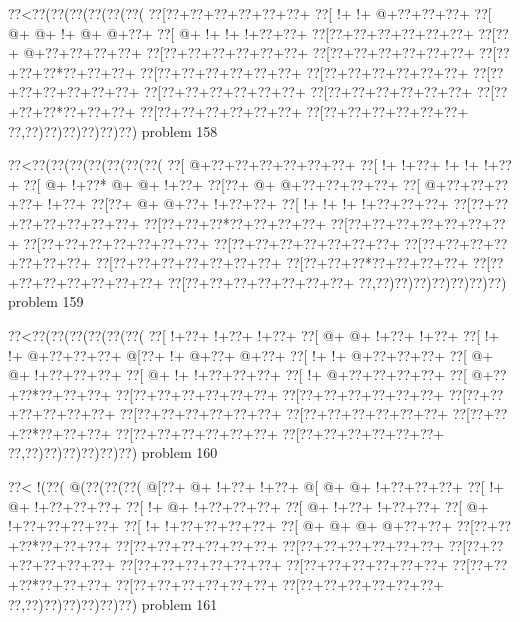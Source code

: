\vbox{\vbox{\goo
\0??<\0??(\0??(\0??(\0??(\0??(\0??(
\0??[\0??+\0??+\0??+\0??+\0??+\0??+
\0??[\- !+\- !+\- @+\0??+\0??+\0??+
\0??[\- @+\- @+\- !+\- @+\- @+\0??+
\0??[\- @+\- !+\- !+\- !+\0??+\0??+
\0??[\0??+\0??+\0??+\0??+\0??+\0??+
\0??[\0??+\- @+\0??+\0??+\0??+\0??+
\0??[\0??+\0??+\0??+\0??+\0??+\0??+
\0??[\0??+\0??+\0??+\0??+\0??+\0??+
\0??[\0??+\0??+\0??*\0??+\0??+\0??+
\0??[\0??+\0??+\0??+\0??+\0??+\0??+
\0??[\0??+\0??+\0??+\0??+\0??+\0??+
\0??[\0??+\0??+\0??+\0??+\0??+\0??+
\0??[\0??+\0??+\0??+\0??+\0??+\0??+
\0??[\0??+\0??+\0??+\0??+\0??+\0??+
\0??[\0??+\0??+\0??*\0??+\0??+\0??+
\0??[\0??+\0??+\0??+\0??+\0??+\0??+
\0??[\0??+\0??+\0??+\0??+\0??+\0??+
\0??,\0??)\0??)\0??)\0??)\0??)\0??)
}
\hfil problem 158\hfil\break
}

\vbox{\vbox{\goo
\0??<\0??(\0??(\0??(\0??(\0??(\0??(\0??(
\0??[\- @+\0??+\0??+\0??+\0??+\0??+\0??+
\0??[\- !+\- !+\0??+\- !+\- !+\- !+\0??+
\0??[\- @+\- !+\0??*\- @+\- @+\- !+\0??+
\0??[\0??+\- @+\- @+\0??+\0??+\0??+\0??+
\0??[\- @+\0??+\0??+\0??+\0??+\- !+\0??+
\0??[\0??+\- @+\- @+\0??+\- !+\0??+\0??+
\0??[\- !+\- !+\- !+\- !+\0??+\0??+\0??+
\0??[\0??+\0??+\0??+\0??+\0??+\0??+\0??+
\0??[\0??+\0??+\0??*\0??+\0??+\0??+\0??+
\0??[\0??+\0??+\0??+\0??+\0??+\0??+\0??+
\0??[\0??+\0??+\0??+\0??+\0??+\0??+\0??+
\0??[\0??+\0??+\0??+\0??+\0??+\0??+\0??+
\0??[\0??+\0??+\0??+\0??+\0??+\0??+\0??+
\0??[\0??+\0??+\0??+\0??+\0??+\0??+\0??+
\0??[\0??+\0??+\0??*\0??+\0??+\0??+\0??+
\0??[\0??+\0??+\0??+\0??+\0??+\0??+\0??+
\0??[\0??+\0??+\0??+\0??+\0??+\0??+\0??+
\0??,\0??)\0??)\0??)\0??)\0??)\0??)\0??)
}
\hfil problem 159\hfil\break
}

\vbox{\vbox{\goo
\0??<\0??(\0??(\0??(\0??(\0??(\0??(
\0??[\- !+\0??+\- !+\0??+\- !+\0??+
\0??[\- @+\- @+\- !+\0??+\- !+\0??+
\0??[\- !+\- !+\- @+\0??+\0??+\0??+
\- @[\0??+\- !+\- @+\0??+\- @+\0??+
\0??[\- !+\- !+\- @+\0??+\0??+\0??+
\0??[\- @+\- @+\- !+\0??+\0??+\0??+
\0??[\- @+\- !+\- !+\0??+\0??+\0??+
\0??[\- !+\- @+\0??+\0??+\0??+\0??+
\0??[\- @+\0??+\0??*\0??+\0??+\0??+
\0??[\0??+\0??+\0??+\0??+\0??+\0??+
\0??[\0??+\0??+\0??+\0??+\0??+\0??+
\0??[\0??+\0??+\0??+\0??+\0??+\0??+
\0??[\0??+\0??+\0??+\0??+\0??+\0??+
\0??[\0??+\0??+\0??+\0??+\0??+\0??+
\0??[\0??+\0??+\0??*\0??+\0??+\0??+
\0??[\0??+\0??+\0??+\0??+\0??+\0??+
\0??[\0??+\0??+\0??+\0??+\0??+\0??+
\0??,\0??)\0??)\0??)\0??)\0??)\0??)
}
\hfil problem 160\hfil\break
}

\vbox{\vbox{\goo
\0??<\- !(\0??(\- @(\0??(\0??(\0??(
\- @[\0??+\- @+\- !+\0??+\- !+\0??+
\- @[\- @+\- @+\- !+\0??+\0??+\0??+
\0??[\- !+\- @+\- !+\0??+\0??+\0??+
\0??[\- !+\- @+\- !+\0??+\0??+\0??+
\0??[\- @+\- !+\0??+\- !+\0??+\0??+
\0??[\- @+\- !+\0??+\0??+\0??+\0??+
\0??[\- !+\- !+\0??+\0??+\0??+\0??+
\0??[\- @+\- @+\- @+\- @+\0??+\0??+
\0??[\0??+\0??+\0??*\0??+\0??+\0??+
\0??[\0??+\0??+\0??+\0??+\0??+\0??+
\0??[\0??+\0??+\0??+\0??+\0??+\0??+
\0??[\0??+\0??+\0??+\0??+\0??+\0??+
\0??[\0??+\0??+\0??+\0??+\0??+\0??+
\0??[\0??+\0??+\0??+\0??+\0??+\0??+
\0??[\0??+\0??+\0??*\0??+\0??+\0??+
\0??[\0??+\0??+\0??+\0??+\0??+\0??+
\0??[\0??+\0??+\0??+\0??+\0??+\0??+
\0??,\0??)\0??)\0??)\0??)\0??)\0??)
}
\hfil problem 161\hfil\break
}

